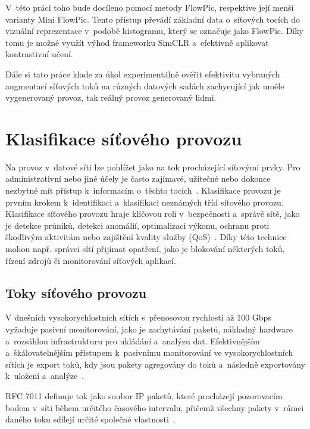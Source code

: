 V~této práci toho bude docíleno pomocí metody FlowPic, respektive její menší varianty Mini FlowPic. Tento přístup převádí základní data o~síťových tocích do vizuální reprezentace v~podobě histogramu, který se označuje jako FlowPic. Díky tomu je možné využít výhod frameworku SimCLR a~efektivně aplikovat kontrastivní učení. 

Dále si tato práce klade za úkol experimentálně ověřit efektivitu vybraných augmentací síťových toků na různých datových sadách zachycující jak uměle vygenerovaný provoz, tak reálný provoz generovaný lidmi.


\chapter{Klasifikace síťového provozu}
Na provoz v~datové síti lze pohlížet jako na tok procházející síťovými prvky. Pro administrativní nebo jiné účely je často zajímavé, užitečné nebo dokonce nezbytné mít přístup k~informacím o~těchto tocích~\cite{rfc7011}. Klasifikace provozu je prvním krokem k~identifikaci a~klasifikaci neznámých tříd síťového provozu. Klasifikace síťového provozu hraje klíčovou roli v~bezpečnosti a~správě sítě, jako je detekce průniků, detekci anomálií, optimalizaci výkonu, ochranu proti škodlivým aktivitám nebo zajištění kvality služby (QoS)~\cite{network_classification}. Díky této technice mohou např. správci sítí přijímat opatření, jako je blokování některých toků, řízení zdrojů či monitorování síťových aplikací.

\section{Toky síťového provozu}
\label{flows}
V dnešních vysokorychlostních sítích s~přenosovou rychlostí až 100 Gbps vyžaduje pasivní monitorování, jako je zachytávání paketů, nákladný hardware a~rozsáhlou infrastrukturu pro ukládání a~analýzu dat. Efektivnějším a~škálovatelnějším přístupem k~pasivnímu monitorování ve vysokorychlostních sítích je export toků, kdy jsou pakety agregovány do toků a~následně exportovány k~uložení a~analýze~\cite{flow_monitoring}.

RFC 7011 definuje tok jako soubor IP paketů, které procházejí pozorovacím bodem v~síti během určitého časového intervalu, přičemž všechny pakety v~rámci daného toku sdílejí určité společné vlastnosti~\cite{rfc7011}.

